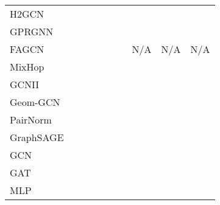 \documentclass{article}
\begin{document}
\begin{table*}[t]
{\begin{tabular}{l ccccccccc}
         H2GCN &
          &
          &
          &
          & 
          &
          &
          &
          &
          \\

         GPRGNN &
          &
          &
          & 
          &
          &
          &
          &
          &
          \\ 
         
         FAGCN &
          &
          &
          &
          &
          & 
          &
         N/A & 
         N/A & 
         N/A \\
         
         MixHop &
          &
          &
          & 
          &
          &
          &
          &
          &
          \\

         GCNII &
          &
           &
          &
          &
          &
          &
          &
          &
          \\
         
         Geom-GCN &
          &
          &
          & 
          & 
          &
          &
          &
          &  
          \\ 
         
         PairNorm &
          &
          &
          & 
          & 
          &
          &
          &
          &
          \\ 
         
         GraphSAGE &
          &
          &
          & 
          & 
          &
          &
          &
          &
         \\
         
         GCN &
          &
          &
          & 
          &
          &
          &
          &
          &
          \\ 
         
         GAT &
          &
          &
          & 
          &
          &
          &
          &
          & 
          \\ 
         
         MLP &
          &
          &
          & 
          & 
          &
          &
          &
          &
          \\ 














         \bottomrule
         
    \end{tabular}
    }
    \vspace{-12pt}
    \label{tab:main_results}
\end{table*} 
\end{document}
